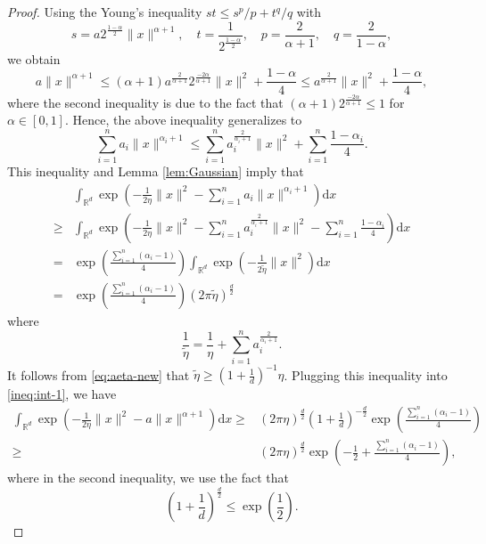 \documentclass[11pt,letterpaper]{article}
\newcommand{\nn}{\nonumber}
\newcommand{\R}{\mathbb{R}}
\newcommand{\rd}{\mathrm{d}}
\begin{document}
\begin{proof}
Using the Young's inequality $st\le s^p/p + t^q/q$ with 
	\[
	s = a 2^{\frac{1-\alpha}{2}} \|x\|^{\alpha+1}, \quad t= \frac{1}{2^{\frac{1-\alpha}{2}}}, \quad p= \frac{2}{\alpha+1}, \quad q= \frac{2}{1-\alpha}, 
	\]
	we obtain 
\[
a\|x\|^{\alpha+1} \le (\alpha+1) a^{\frac{2}{\alpha+1}} 2^{\frac{-2\alpha}{\alpha+1}} \|x\|^2 + \frac{1-\alpha}{4} \le a^{\frac{2}{\alpha+1}} \|x\|^2 + \frac{1-\alpha}{4},
\]
where the second inequality is due to the fact that $(\alpha+1) 2^{\frac{-2\alpha}{\alpha+1}} \le 1$ for $\alpha \in [0,1]$.
Hence, the above inequality generalizes to
\[
\sum_{i=1}^n a_i\|x\|^{\alpha_i+1} \le \sum_{i=1}^n a_i^{\frac{2}{\alpha_i+1}}  \|x\|^2 + \sum_{i=1}^n \frac{1-\alpha_i}{4}.
\]
This inequality and Lemma \ref{lem:Gaussian} imply that
\begin{align}
    &\int_{\R^d} \exp\left(-\frac{1}{2\eta}\|x\|^2 - \sum_{i=1}^n a_i\|x\|^{\alpha_i+1}\right) \rd x \nn \\
    \ge &\int_{\R^d} \exp\left(-\frac{1}{2\eta}\|x\|^2 - \sum_{i=1}^n a_i^{\frac{2}{\alpha_i+1}} \|x\|^2 - \sum_{i=1}^n \frac{1-\alpha_i}{4}\right) \rd x \nn \\
    =& \exp \left(\frac{\sum_{i=1}^n (\alpha_i-1)}{4}\right) \int_{\R^d} \exp\left(-\frac{1}{2\tilde \eta}\|x\|^2\right) \rd x \nn \\
    = & \exp \left( \frac{\sum_{i=1}^n (\alpha_i-1)}{4}\right) (2\pi \tilde \eta )^{\frac d2}  \label{ineq:int-1}
\end{align}
where
\begin{equation}\label{eq:eta'}
    \frac{1}{\tilde \eta} = \frac{1}{\eta} +  \sum_{i=1}^n a_i^{\frac{2}{\alpha_i+1}}.
\end{equation}
It follows from \eqref{eq:aeta-new} that
$\tilde \eta \ge \left(1+\frac1d \right)^{-1} \eta$.
Plugging this inequality into \eqref{ineq:int-1}, we have
\begin{align*}
    \int_{\R^d} \exp\left(-\frac{1}{2\eta}\|x\|^2 - a\|x\|^{\alpha+1}\right) \rd x 
    \ge & (2\pi \eta )^{\frac d2} \left(1+\frac1d \right)^{-\frac{d}{2}} \exp \left( \frac{\sum_{i=1}^n (\alpha_i-1)}{4}\right)\\
    \ge & (2\pi \eta )^{\frac d2} \exp \left( -\frac12 + \frac{\sum_{i=1}^n (\alpha_i-1)}{4}\right),
\end{align*}
where in the second inequality, we use the fact that
\[
\left(1+\frac1d\right)^{\frac{d}{2}} \le \exp\left(\frac12 \right).
\]
\end{proof}
\end{document}

